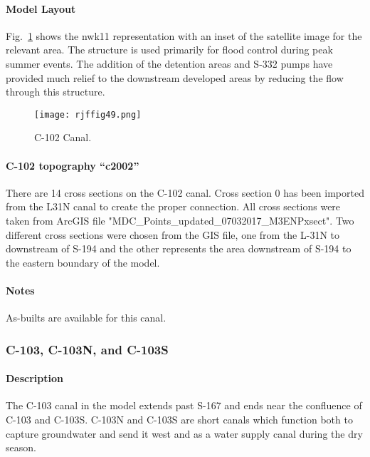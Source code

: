 \paragraph{Model Layout}
Fig.~\ref{fig:rjffig49} shows the nwk11 representation with an inset of the satellite image for the relevant area. The structure is used primarily for flood control during peak summer events. The addition of the detention areas and S-332 pumps have provided much relief to the downstream developed areas by reducing the  flow through this structure.

\begin{figure}[!h]
  \begin{center}
  \texttt{[image: rjffig49.png]}
  \caption{C-102 Canal.}
  \label{fig:rjffig49}
  \end{center}
\end{figure}


\paragraph{C-102 topography ``c2002''}
There are 14 cross sections on the C-102 canal.  Cross section 0 has been imported from the L31N canal to create the proper connection.  All cross sections were taken from ArcGIS file "MDC\_Points\_updated\_07032017\_M3ENPxsect".  Two different cross sections were chosen from the GIS file, one from the L-31N to downstream of S-194 and the other represents the area downstream of S-194 to the eastern boundary of the model.


\begin{notes}
\paragraph{Notes}
As-builts are available for this canal.
\end{notes}

\clearpage
\subsubsection{C-103, C-103N, and C-103S}
\paragraph{Description}
The C-103 canal in the model extends past S-167 and ends near the confluence of C-103 and C-103S. C-103N and C-103S are short canals which function both to capture groundwater and send it west and as a water supply canal during the dry season.

